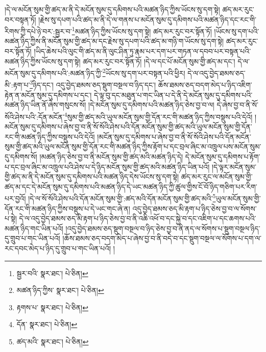 །དེ་ལ་མངོན་སུམ་གྱི་ཚད་མ་ནི་དེ་མངོན་སུམ་དུ་དམིགས་པའི་མཚན་ཉིད་ཀྱིས་ཡོངས་སུ་དག་སྟེ། ཚད་མར་རུང་བར་བསྟན་ཏོ། །རྗེས་སུ་དཔག་པའི་ཚད་མ་ནི་དེ་ལ་གནས་པ་མངོན་སུམ་དུ་དམིགས་པའི་མཚན་ཉིད་དང་རང་གི་རིགས་ཀྱི་དཔེ་ཉེ་བར་:སྦྱར་བ་\footnote{སྦྱར་བའི་  སྣར་ཐང་།  པེ་ཅིན། }མཚན་ཉིད་ཀྱིས་ཡོངས་སུ་དག་སྟེ། ཚད་མར་རུང་བར་སྟོན་ཏོ། །ཡོངས་སུ་དག་པའི་མཚན་ཉིད་ཀྱིས་ནི་མངོན་སུམ་གྱི་ཚད་མ་དང་རྗེས་སུ་དཔག་པའི་ཚད་མ་གཉི་ག་ཡོངས་སུ་དག་སྟེ། ཚད་མར་རུང་བར་སྟོན་ཏོ། །ཡིད་ཆེས་པའི་ལུང་གི་ཚད་མ་ནི་ལུང་ཤིན་ཏུ་རྣམ་པར་དག་པར་གཏན་ལ་དབབ་པར་བསྟན་པའི་མཚན་ཉིད་ཀྱིས་ཡོངས་སུ་དག་སྟེ། ཚད་མར་རུང་བར་སྟོན་ཏོ། །དེ་ལ་དང་པོ་མངོན་སུམ་གྱི་ཚད་མ་དང་། དེ་ལ་མངོན་སུམ་དུ་དམིགས་པའི་:མཚན་ཉིད་ཀྱི་\footnote{མཚན་ཉིད་ཀྱིས་  སྣར་ཐང་།  པེ་ཅིན། }ཡོངས་སུ་དག་པར་བསྟན་པའི་ཕྱིར། དེ་ལ་འདུ་བྱེད་ཐམས་ཅད་མི་:རྟག་པ་\footnote{རྟགས་པ་  སྣར་ཐང་།  པེ་ཅིན། }ཉིད་དང་། འདུ་བྱེད་ཐམས་ཅད་སྡུག་བསྔལ་བ་ཉིད་དང་། ཆོས་ཐམས་ཅད་བདག་མེད་པ་ཉིད་འཇིག་རྟེན་ན་མངོན་སུམ་དུ་དམིགས་པ་དང་། དེ་ལྟ་བུ་དང་མཐུན་པ་གང་ཡིན་པ་དེ་ནི་དེ་མངོན་སུམ་དུ་དམིགས་པའི་མཚན་ཉིད་ཡིན་ནོ་ཞེས་གསུངས་སོ། །དེ་མངོན་སུམ་དུ་དམིགས་པའི་མཚན་ཉིད་ཅེས་བྱ་བ་ལ། དེ་ཞེས་བྱ་བ་ནི་སོ་སོའི་ཤེས་པའི་:དོན་མངོན་\footnote{དོན་  སྣར་ཐང་།  པེ་ཅིན། }སུམ་གྱི་ཚད་མའི་ཡུལ་མངོན་སུམ་གྱི་དོན་རང་གི་མཚན་ཉིད་ཀྱིས་བསྡུས་པའི་དེའོ། །མངོན་སུམ་དུ་དམིགས་པ་ཞེས་བྱ་བ་ནི་སོ་སོའི་ཤེས་པའི་དོན་མངོན་སུམ་གྱི་ཚད་མའི་ཡུལ་མངོན་སུམ་གྱི་དོན་རང་གི་མཚན་ཉིད་ཀྱིས་བསྡུས་པའི་དེའོ། །མངོན་སུམ་དུ་དམིགས་པ་ཞེས་བྱ་བ་ནི་སོ་སོའི་ཤེས་པའི་དོན་མངོན་སུམ་གྱི་ཚད་མའི་ཡུལ་མངོན་སུམ་གྱི་དོན་རང་གི་མཚན་ཉིད་ཀྱིས་རྟོག་པ་དང་བྲལ་ཞིང་མ་འཁྲུལ་པས་མངོན་སུམ་དུ་དམིགས་སོ། །མཚན་ཉིད་ཅེས་བྱ་བ་ནི་མངོན་སུམ་གྱི་ཚད་མའི་མཚན་ཉིད་དེ། དེ་མངོན་སུམ་དུ་དམིགས་པ་རྟོག་པ་དང་བྲལ་ཞིང་མ་འཁྲུལ་པའི་ཤེས་པ་དེ་ཉིད་མངོན་སུམ་གྱི་ཚད་མའི་མཚན་ཉིད་ཡིན་པའོ། །དེ་ལྟར་མངོན་སུམ་གྱི་ཚད་མ་ནི་དེ་མངོན་སུམ་དུ་དམིགས་པའི་མཚན་ཉིད་དེས་ཡོངས་སུ་དག་སྟེ། ཚད་མར་རུང་ལ་མངོན་སུམ་གྱི་ཚད་མ་དང་དེ་མངོན་སུམ་དུ་དམིགས་པའི་མཚན་ཉིད་དེ་ཡང་མཚན་ཉིད་ཀྱི་ཚུལ་གྱིས་ངོ་བོ་ཉིད་གཅིག་པར་རིག་པར་བྱའོ། །དེ་ལ་སོ་སོའི་ཤེས་པའི་དོན་མངོན་སུམ་གྱི་:ཚད་མའི་དོན་མངོན་སུམ་གྱི་ཚད་མའི་\footnote{ཚད་མའི་  སྣར་ཐང་།  པེ་ཅིན། }ཡུལ་མངོན་སུམ་གྱི་དོན་རང་གི་མཚན་ཉིད་ཀྱིས་བསྡུས་པ་དེ་ཡང་གང་ཞེ་ན། འདུ་བྱེད་ཐམས་ཅད་མི་རྟག་པ་ཉིད་ཅེས་བྱ་བ་ལ་སོགས་པ་སྟེ། དེ་ལ་འདུ་བྱེད་ཐམས་ཅད་མི་རྟག་པ་ཉིད་ཅེས་བྱ་བ་ནི་འཆི་འཕོ་བ་དང་སྐྱེ་བ་དང་འཇིག་པ་དང་ཆགས་པའི་མཚན་ཉིད་གང་ཡིན་པའོ། །འདུ་བྱེད་ཐམས་ཅད་སྡུག་བསྔལ་བ་ཉིད་ཅེས་བྱ་བ་ནི་ནད་ལ་སོགས་པ་སྡུག་བསྔལ་ཉིད་དུ་གྲུབ་པ་གང་ཡིན་པའོ། །ཆོས་ཐམས་ཅད་བདག་མེད་པ་ཞེས་བྱ་བ་ནི་བདེ་བ་དང་སྡུག་བསྔལ་ལ་སོགས་པ་དག་ལ་རང་དབང་མེད་པ་ཉིད་དུ་གྲུབ་པ་གང་ཡིན་པའོ། །
